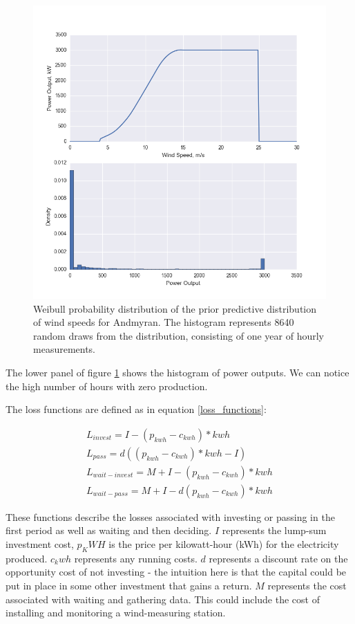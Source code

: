 \documentclass[11pt]{article}
\begin{document}
\begin{figure}
	\includegraphics[width=1\textwidth]{figures/power_output.png}
	\caption{Weibull probability distribution of the prior predictive distribution of wind speeds for Andmyran. The histogram represents 8640 random draws from the distribution, consisting of one year of hourly measurements.}
	\label{power_output}
\end{figure}

The lower panel of figure \ref{power_output} shows the histogram of power outputs. We can notice the high number of hours with zero production.

The loss functions are defined as in equation \ref{loss_functions}:

\begin{align}
L_{invest} = I - (p_{kwh} - c_{kwh})*kwh\\
L_{pass} = d((p_{kwh} - c_{kwh})*kwh-I)\\
L_{wait-invest} = M + I - (p_{kwh} - c_{kwh})*kwh\\
L_{wait-pass} = M + I - d(p_{kwh} - c_{kwh})*kwh
\label{loss_functions}
\end{align}

These functions describe the losses associated with investing or passing in the first period as well as waiting and then deciding. $I$ represents the lump-sum investment cost, $p_KWH$ is the price per kilowatt-hour (kWh) for the electricity produced. $c_kwh$ represents any running costs. $d$ represents a discount rate on the opportunity cost of not investing - the intuition here is that the capital could be put in place in some other investment that gains a return. $M$ represents the cost associated with waiting and gathering data. This could include the cost of installing and monitoring a wind-measuring station.
\end{document}
